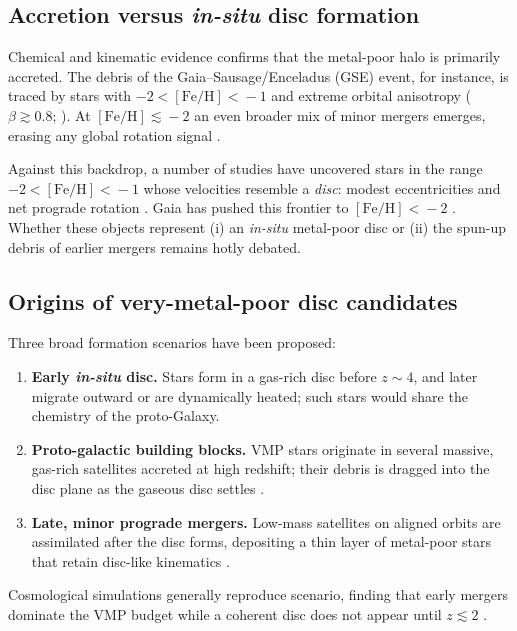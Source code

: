 \documentclass[a4paper,12pt]{article}
\begin{document}
\subsection{Accretion versus {\it in-situ} disc formation}
\label{subsec:accretion_vs_insitu}

Chemical and kinematic evidence confirms that the metal-poor halo 
is primarily accreted.  The debris of the Gaia–Sausage/Enceladus (GSE) event, for instance, 
is traced by stars with $-2\!<\![\mathrm{Fe/H}]\!<\!-1$ and extreme orbital anisotropy 
($\beta\!\gtrsim\!0.8$; \citealt{Belokurov2018,Helmi2018}).  
At $[\mathrm{Fe/H}]\!\lesssim\!-2$ an even broader mix of minor mergers emerges, 
erasing any global rotation signal \citep{Lancaster2019,Bird2021}.  

Against this backdrop, a number of studies have uncovered stars in the range 
$-2\!<\![\mathrm{Fe/H}]\!<\!-1$ whose velocities resemble a \emph{disc}:  
modest eccentricities and net prograde rotation 
\citep{Norris1985,Chiba2000,Carollo2019,An2020}.  
Gaia has pushed this frontier to $[\mathrm{Fe/H}]\!<\!-2$  
\citep{Sestito2019,Venn2020,Cordoni2020,Mardini2022}.  
Whether these objects represent (i) an {\it in-situ} metal-poor disc or (ii) the spun-up debris of  
earlier mergers remains hotly debated.

\subsection{Origins of very-metal-poor disc candidates}
\label{subsec:origins_VMP_disc}

Three broad formation scenarios have been proposed:
\begin{enumerate}
    \item \textbf{Early {\it in-situ} disc.}  
          Stars form in a gas-rich disc before $z\!\sim\!4$, and later migrate outward 
          or are dynamically heated; such stars would share the chemistry of the proto-Galaxy. 
    \item \textbf{Proto-galactic building blocks.}  
          VMP stars originate in several massive, gas-rich satellites accreted at high redshift;  
          their debris is dragged into the disc plane as the gaseous disc settles 
          \citep[e.g.][]{Sestito2020}. 
    \item \textbf{Late, minor prograde mergers.}  
          Low-mass satellites on aligned orbits are assimilated after the disc forms,  
          depositing a thin layer of metal-poor stars that retain disc-like kinematics 
          \citep{Santistevan2021}.
\end{enumerate}
Cosmological simulations generally reproduce scenario,  
finding that early mergers dominate the VMP budget while a coherent disc does not appear  
until $z\!\lesssim\!2$ \citep{Gurvich2023}.  
\end{document}
